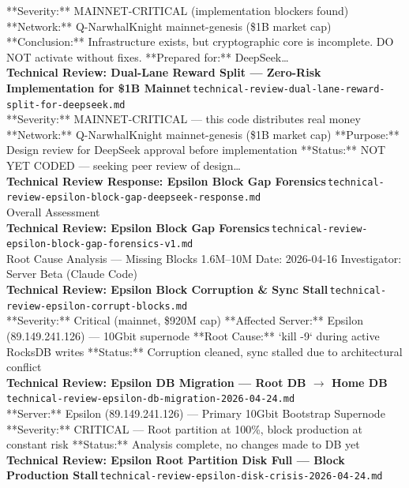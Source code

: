 \documentclass[11pt,a4paper]{article}
\begin{document}
**Severity:** MAINNET-CRITICAL (implementation blockers found) **Network:** Q-NarwhalKnight mainnet-genesis (\$1B market cap) **Conclusion:** Infrastructure exists, but cryptographic core is incomplete. DO NOT activate without fixes. **Prepared for:** DeepSeek\ldots{}\\[6pt]
\noindent\textbf{Technical Review: Dual-Lane Reward Split --- Zero-Risk Implementation for \$1B Mainnet}\,\textcolor{qgray}{\small \texttt{technical-review-dual-lane-reward-split-for-deepseek.md}}\\
**Severity:** MAINNET-CRITICAL --- this code distributes real money **Network:** Q-NarwhalKnight mainnet-genesis (\$1B market cap) **Purpose:** Design review for DeepSeek approval before implementation **Status:** NOT YET CODED --- seeking peer review of design\ldots{}\\[6pt]
\noindent\textbf{Technical Review Response: Epsilon Block Gap Forensics}\,\textcolor{qgray}{\small \texttt{technical-review-epsilon-block-gap-deepseek-response.md}}\\
Overall Assessment\\[6pt]
\noindent\textbf{Technical Review: Epsilon Block Gap Forensics}\,\textcolor{qgray}{\small \texttt{technical-review-epsilon-block-gap-forensics-v1.md}}\\
Root Cause Analysis --- Missing Blocks 1.6M--10M Date: 2026-04-16 \textbar{} Investigator: Server Beta (Claude Code)\\[6pt]
\noindent\textbf{Technical Review: Epsilon Block Corruption \& Sync Stall}\,\textcolor{qgray}{\small \texttt{technical-review-epsilon-corrupt-blocks.md}}\\
**Severity:** Critical (mainnet, \$920M cap) **Affected Server:** Epsilon (89.149.241.126) --- 10Gbit supernode **Root Cause:** `kill -9` during active RocksDB writes **Status:** Corruption cleaned, sync stalled due to architectural conflict\\[6pt]
\noindent\textbf{Technical Review: Epsilon DB Migration --- Root DB $\rightarrow$ Home DB}\,\textcolor{qgray}{\small \texttt{technical-review-epsilon-db-migration-2026-04-24.md}}\\
**Server:** Epsilon (89.149.241.126) --- Primary 10Gbit Bootstrap Supernode **Severity:** CRITICAL --- Root partition at 100\%, block production at constant risk **Status:** Analysis complete, no changes made to DB yet\\[6pt]
\noindent\textbf{Technical Review: Epsilon Root Partition Disk Full --- Block Production Stall}\,\textcolor{qgray}{\small \texttt{technical-review-epsilon-disk-crisis-2026-04-24.md}}\\
\end{document}
